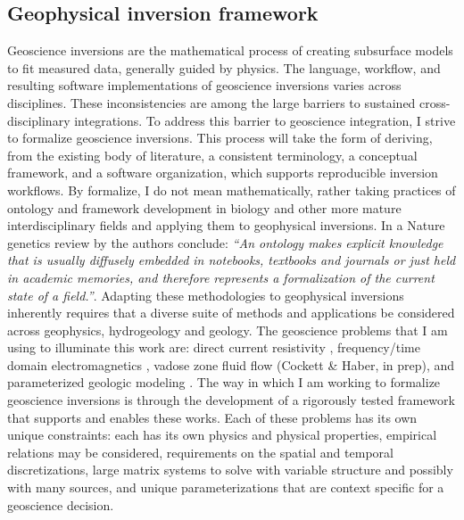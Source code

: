 \documentclass[11pt]{article}
\begin{document}
\subsection{Geophysical inversion framework}

Geoscience inversions are the mathematical process of creating subsurface models to fit measured data, generally guided by physics. The language, workflow, and resulting software implementations of geoscience inversions varies across disciplines. These inconsistencies are among the large barriers to sustained cross-disciplinary integrations.
To address this barrier to geoscience integration, I strive to formalize geoscience inversions. This process will take the form of deriving, from the existing body of literature, a consistent terminology, a conceptual framework, and a software organization, which supports reproducible inversion workflows.
By formalize, I do not mean mathematically, rather taking practices of ontology and framework development in biology and other more mature interdisciplinary fields and applying them to geophysical inversions. In a Nature genetics review by \cite{Bard2004} the authors conclude: \emph{``An ontology makes explicit knowledge that is usually diffusely embedded in notebooks, textbooks and journals or just held in academic memories, and therefore represents a formalization of the current state of a field.''}.
Adapting these methodologies to geophysical inversions inherently requires that a diverse suite of methods and applications be considered across geophysics, hydrogeology and geology. The geoscience problems that I am using to illuminate this work are: direct current resistivity \citep{Cockett2014a,Pidlisecky2013,Steklova2012}, frequency/time domain electromagnetics \citep{Kang2014,Heagy2015,Fohring2012,Kang2015}, vadose zone fluid flow (Cockett \& Haber, in prep), and parameterized geologic modeling \citep{Cockett2016,Cockett2013b,Cockett2012}.
The way in which I am working to formalize geoscience inversions is through the development of a rigorously tested framework that supports and enables these works. Each of these problems has its own unique constraints: each has its own physics and physical properties, empirical relations may be considered, requirements on the spatial and temporal discretizations, large matrix systems to solve with variable structure and possibly with many sources, and unique parameterizations that are context specific for a geoscience decision.
\end{document}
